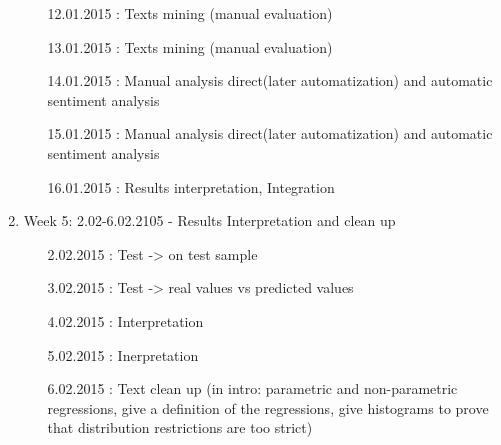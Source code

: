 \documentclass {article}
\begin{document}
\begin{enumerate}
\begin{enumerate}
		\item[12.01.2015]: Texts mining (manual evaluation) 
		\item[13.01.2015]: Texts mining (manual evaluation)
		\item[14.01.2015]: Manual analysis direct(later automatization) and automatic sentiment analysis
		\item[15.01.2015]: Manual analysis direct(later automatization) and automatic sentiment analysis
		\item[16.01.2015]: Results interpretation, Integration 
	\end{enumerate}
	\item Week 5: 2.02-6.02.2105 - Results Interpretation and clean up
	\begin{enumerate}
		\item[2.02.2015]: Test -> on test sample
		\item[3.02.2015]: Test -> real values vs predicted values 
		\item[4.02.2015]: Interpretation
		\item[5.02.2015]: Inerpretation
		\item[6.02.2015]: Text clean up (in intro: parametric and non-parametric regressions, give a definition of the regressions, give histograms to prove that distribution restrictions are too strict)
	\end{enumerate}
\end{enumerate}
\end{document}
